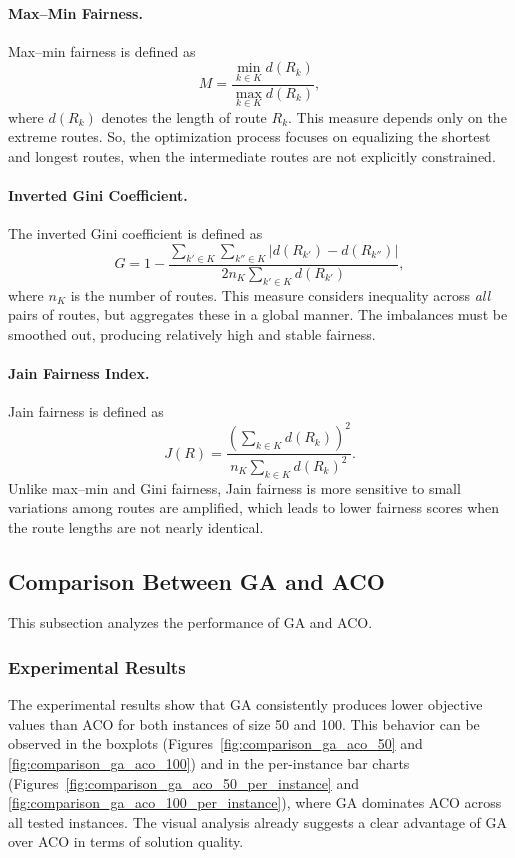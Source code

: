 \documentclass[12pt]{article}
\begin{document}
\paragraph{Max--Min Fairness.}
Max--min fairness is defined as
\[
M = \frac{\min_{k \in K} d(R_k)}{\max_{k \in K} d(R_k)},
\]
where $d(R_k)$ denotes the length of route $R_k$.
This measure depends only on the extreme routes.
So, the optimization process focuses on equalizing the shortest and longest
routes, when the intermediate routes are not explicitly constrained.

\paragraph{Inverted Gini Coefficient.}
The inverted Gini coefficient is defined as
\[
G = 1 -
\frac{
\sum_{k' \in K} \sum_{k'' \in K}
\left| d(R_{k'}) - d(R_{k''}) \right|
}{
2 n_K \sum_{k' \in K} d(R_{k'})
},
\]
where $n_K$ is the number of routes.
This measure considers inequality across \emph{all} pairs of routes, but aggregates these
in a global manner.
The imbalances must be smoothed out, producing relatively high and stable
fairness.

\paragraph{Jain Fairness Index.}
Jain fairness is defined as
\[
J(R) =
\frac{\left( \sum_{k \in K} d(R_k) \right)^2}
{n_K \sum_{k \in K} d(R_k)^2}.
\]
Unlike max--min and Gini fairness, Jain fairness is more sensitive to small variations among routes are amplified, which leads to lower fairness scores when
the route lengths are not nearly identical.




\pagebreak

\subsection{Comparison Between GA and ACO}

This subsection analyzes the performance of GA and ACO.

\subsubsection{Experimental Results}

The experimental results show that GA consistently produces lower objective
values than ACO for both instances of size 50 and 100. This behavior can be observed
in the boxplots (Figures~\ref{fig:comparison_ga_aco_50} and \ref{fig:comparison_ga_aco_100}) and in the per-instance bar charts (Figures~\ref{fig:comparison_ga_aco_50_per_instance} and \ref{fig:comparison_ga_aco_100_per_instance}), where GA dominates ACO across all
tested instances. The visual analysis already suggests a clear advantage of GA
over ACO in terms of solution quality.
\end{document}

